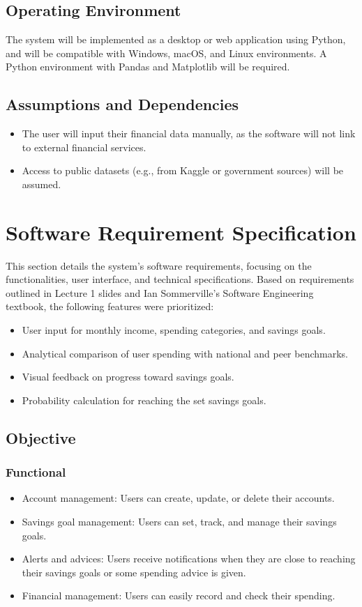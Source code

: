 \documentclass{article}
\begin{document}
\subsection{Operating Environment}
The system will be implemented as a desktop or web application using Python, and will be compatible with Windows, macOS, and Linux environments. A Python environment with Pandas and Matplotlib will be required.

\subsection{Assumptions and Dependencies}
\begin{itemize}
    \item The user will input their financial data manually, as the software will not link to external financial services.
    \item Access to public datasets (e.g., from Kaggle or government sources) will be assumed.
\end{itemize}

\section{Software Requirement Specification}
This section details the system’s software requirements, focusing on the functionalities, user interface, and technical specifications. Based on requirements outlined in Lecture 1 slides and Ian Sommerville's Software Engineering textbook, the following features were prioritized: \begin{itemize} \item User input for monthly income, spending categories, and savings goals. \item Analytical comparison of user spending with national and peer benchmarks. \item Visual feedback on progress toward savings goals. \item Probability calculation for reaching the set savings goals. \end{itemize}

\subsection{Objective}
\subsubsection{Functional}
\begin{itemize}
    \item Account management: Users can create, update, or delete their accounts.
    \item Savings goal management: Users can set, track, and manage their savings goals.
    \item Alerts and advices: Users receive notifications when they are close to reaching their savings goals or some spending advice is given.
    \item Financial management: Users can easily record and check their spending.
\end{itemize}
\end{document}
